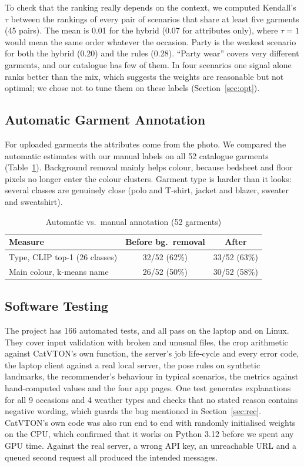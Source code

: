 \documentclass{article}
\begin{document}
To check that the ranking really depends on the context, we computed Kendall's $\tau$ between the
rankings of every pair of scenarios that share at least five garments (45 pairs). The mean is 0.01 for
the hybrid (0.07 for attributes only), where $\tau=1$ would mean the same order whatever the occasion.
Party is the weakest scenario for both the hybrid (0.20) and the rules (0.28). ``Party wear'' covers
very different garments, and our catalogue has few of them. In four scenarios one signal alone ranks
better than the mix, which suggests the weights are reasonable but not optimal; we chose not to tune
them on these labels (Section~\ref{sec:opt}).

\subsection{Automatic Garment Annotation}

For uploaded garments the attributes come from the photo. We compared the automatic estimates with our
manual labels on all 52 catalogue garments (Table~\ref{tab:auto}). Background removal mainly helps colour,
because bedsheet and floor pixels no longer enter the colour clusters. Garment type is harder than it
looks: several classes are genuinely close (polo and T-shirt, jacket and blazer, sweater and sweatshirt).

\begin{table}[t]
\caption{Automatic vs.\ manual annotation (52 garments)}
\label{tab:auto}
\centering
\setlength{\tabcolsep}{4pt}
\begin{tabular}{@{}lcc@{}}
\toprule
Measure & Before bg.\ removal & After\\
\midrule
Type, CLIP top-1 (26 classes) & 32/52 (62\%) & 33/52 (63\%)\\
Main colour, k-means name & 26/52 (50\%) & 30/52 (58\%)\\
\bottomrule
\end{tabular}
\end{table}

\subsection{Software Testing}
\label{sec:tests}

The project has 166 automated tests, and all pass on the laptop and on Linux. They cover input
validation with broken and unusual files, the crop arithmetic against CatVTON's own function, the
server's job life-cycle and every error code, the laptop client against a real local server, the pose
rules on synthetic landmarks, the recommender's behaviour in typical scenarios, the metrics against
hand-computed values and the four app pages. One test generates explanations for all 9 occasions and 4
weather types and checks that no stated reason contains negative wording, which guards the bug mentioned
in Section~\ref{sec:rec}. CatVTON's own code was also run end to end with randomly initialised weights
on the CPU, which confirmed that it works on Python 3.12 before we spent any GPU time. Against the real
server, a wrong API key, an unreachable URL and a queued second request all produced the intended
messages.
\end{document}
